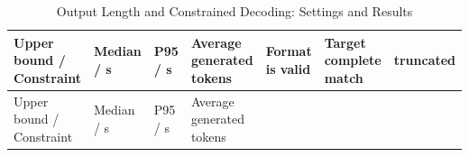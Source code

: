 \FloatBarrier\begingroup\small\setlength{\tabcolsep}{2.5pt}
\begin{longtable}[]{@{}
  >{\raggedright\arraybackslash}p{}
  >{\raggedright\arraybackslash}p{}
  >{\raggedright\arraybackslash}p{}
  >{\raggedright\arraybackslash}p{}
  >{\raggedright\arraybackslash}p{}
  >{\raggedright\arraybackslash}p{}
  >{\raggedright\arraybackslash}p{}@{}}
\caption{Output Length and Constrained Decoding: Settings and Results}\label{tab:s18-4}\tabularnewline
\toprule\noalign{}
\begin{minipage}[b]{\linewidth}\raggedright
Upper bound / Constraint
\end{minipage} & \begin{minipage}[b]{\linewidth}\raggedright
Median / s
\end{minipage} & \begin{minipage}[b]{\linewidth}\raggedright
P95 / s
\end{minipage} & \begin{minipage}[b]{\linewidth}\raggedright
Average generated tokens
\end{minipage} & \begin{minipage}[b]{\linewidth}\raggedright
Format is valid
\end{minipage} & \begin{minipage}[b]{\linewidth}\raggedright
Target complete match
\end{minipage} & \begin{minipage}[b]{\linewidth}\raggedright
truncated
\end{minipage} \\
\midrule\noalign{}
\endfirsthead
\toprule\noalign{}
\begin{minipage}[b]{\linewidth}\raggedright
Upper bound / Constraint
\end{minipage} & \begin{minipage}[b]{\linewidth}\raggedright
Median / s
\end{minipage} & \begin{minipage}[b]{\linewidth}\raggedright
P95 / s
\end{minipage} & \begin{minipage}[b]{\linewidth}\raggedright
Average generated tokens
\end{minipage} & \begin{minipage}[b]{\linewidth}\raggedright

\end{minipage}
\end{longtable}
